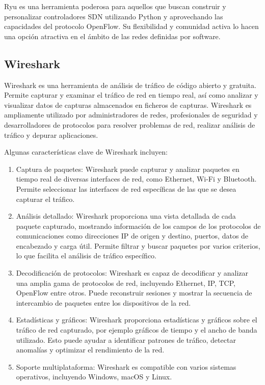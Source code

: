 \documentclass[a4paper, 12pt]{book}
\begin{document}
	Ryu es una herramienta poderosa para aquellos que buscan construir y personalizar controladores SDN utilizando Python y aprovechando las capacidades del protocolo OpenFlow. Su flexibilidad y comunidad activa lo hacen una opción atractiva en el ámbito de las redes definidas por software.
	
	\subsection{Wireshark} 
	\label{sec:wireshark}
	
	Wireshark es una herramienta de análisis de tráfico de código abierto y gratuita. Permite capturar y examinar el tráfico de red en tiempo real, así como analizar y visualizar datos de capturas almacenados en ficheros de capturas. Wireshark es ampliamente utilizado por administradores de redes, profesionales de seguridad y desarrolladores de protocolos para resolver problemas de red, realizar análisis de tráfico y depurar aplicaciones.
	
	Algunas características clave de Wireshark incluyen:
	
	\begin{enumerate}
		\item 	Captura de paquetes: Wireshark puede capturar y analizar paquetes en tiempo real de diversas interfaces de red, como Ethernet, Wi-Fi y Bluetooth. Permite seleccionar las interfaces de red específicas de las que se desea capturar el tráfico.	
		\item 	Análisis detallado: Wireshark proporciona una vista detallada de cada paquete capturado, mostrando información de los campos de los protocolos de comunicaciones como direcciones IP de origen y destino, puertos, datos de encabezado y carga útil. Permite filtrar y buscar paquetes por varios criterios, lo que facilita el análisis de tráfico específico.
		\item 	Decodificación de protocolos: Wireshark es capaz de decodificar y analizar una amplia gama de protocolos de red, incluyendo Ethernet, IP, TCP, OpenFlow entre otros. Puede reconstruir sesiones y mostrar la secuencia de intercambio de paquetes entre los dispositivos de la red.
		\item 	Estadísticas y gráficos: Wireshark proporciona estadísticas y gráficos sobre el tráfico de red capturado, por ejemplo gráficos de tiempo y el ancho de banda utilizado. Esto puede ayudar a identificar patrones de tráfico, detectar anomalías y optimizar el rendimiento de la red.
		\item   Soporte multiplataforma: Wireshark es compatible con varios sistemas operativos, incluyendo Windows, macOS y Linux. 
	\end{enumerate}
	
\end{document}
